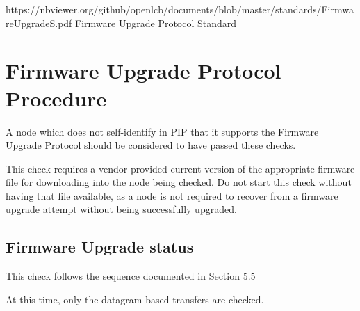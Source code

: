 



\maketitle
\thispagestyle{firststyle}

\introductionCaveats
    {https://nbviewer.org/github/openlcb/documents/blob/master/standards/FirmwareUpgradeS.pdf}
    {Firmware Upgrade Protocol Standard}

\section{Firmware Upgrade Protocol Procedure}


A node which does not self-identify in PIP that it supports
the Firmware Upgrade Protocol should be considered to have passed these checks.
\pipsetFootnote

This check requires a vendor-provided current version of the 
appropriate firmware file for downloading into the node being checked.
Do not start this check without having that file available,
as a node is not required to recover from a firmware upgrade attempt without
being successfully upgraded.

\subsection{Firmware Upgrade status}

This check follows the sequence documented in Section 5.5

At this time, only the datagram-based transfers are checked.

